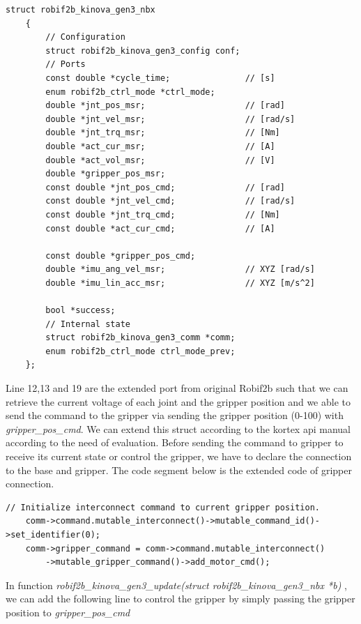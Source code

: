 \documentclass[report.tex]{subfiles}
\begin{document}
    \begin{lstlisting}[caption = {Struct of the enabled ports for base and actuator of Kinova kortex api in Robif2b},label={lst:Robif2b}]
    struct robif2b_kinova_gen3_nbx
    {
        // Configuration
        struct robif2b_kinova_gen3_config conf;
        // Ports
        const double *cycle_time;               // [s]
        enum robif2b_ctrl_mode *ctrl_mode;
        double *jnt_pos_msr;                    // [rad]
        double *jnt_vel_msr;                    // [rad/s]
        double *jnt_trq_msr;                    // [Nm]
        double *act_cur_msr;                    // [A]
        double *act_vol_msr;                    // [V]
        double *gripper_pos_msr;
        const double *jnt_pos_cmd;              // [rad]
        const double *jnt_vel_cmd;              // [rad/s]
        const double *jnt_trq_cmd;              // [Nm]
        const double *act_cur_cmd;              // [A]

        const double *gripper_pos_cmd;  
        double *imu_ang_vel_msr;                // XYZ [rad/s]
        double *imu_lin_acc_msr;                // XYZ [m/s^2]
        
        bool *success;
        // Internal state
        struct robif2b_kinova_gen3_comm *comm;
        enum robif2b_ctrl_mode ctrl_mode_prev;
    };
\end{lstlisting}
Line 12,13 and 19 are the extended port from original Robif2b such that we can retrieve the current voltage of each joint and the gripper position and we able to send the command to the gripper via sending the gripper position (0-100) with \textit{gripper\_pos\_cmd}. We can extend this struct according to the kortex api manual \cite{Kinovaapi} according to the need of evaluation.
Before sending the command to gripper to receive its current state or control the gripper, we have to declare the connection to the base and gripper. The code segment below is the extended code of gripper connection.
\begin{lstlisting}[caption = {Establish connection between base and gripper},label={lst:Robif2b_gripper}]
    // Initialize interconnect command to current gripper position.
    comm->command.mutable_interconnect()->mutable_command_id()->set_identifier(0);
    comm->gripper_command = comm->command.mutable_interconnect()
        ->mutable_gripper_command()->add_motor_cmd();
\end{lstlisting}

In function \textit{robif2b\_kinova\_gen3\_update(struct robif2b\_kinova\_gen3\_nbx *b)} , we can add the following line to control the gripper by simply passing the gripper position to \textit{gripper\_pos\_cmd} 
\end{document}
